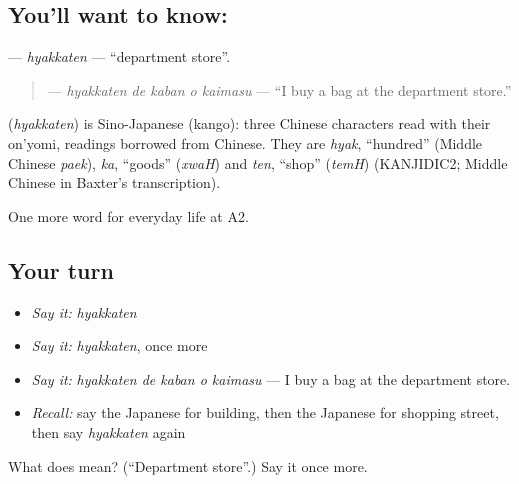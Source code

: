 \subsection*{You'll want to know: }
\textbf{} — \emph{hyakkaten} — \textquotedblleft{}department store\textquotedblright{}.

\begin{quote}
\textbf{  } — \emph{hyakkaten de kaban o kaimasu} — \textquotedblleft{}I buy a bag at the department store.\textquotedblright{}
\end{quote}

\begin{cousinweb}
\textbf{} (\emph{hyakkaten}) is Sino-Japanese (kango): three Chinese characters read with their on'yomi, readings borrowed from Chinese. They are \emph{hyak}, \textquotedblleft{}hundred\textquotedblright{} (Middle Chinese \emph{paek}), \emph{ka}, \textquotedblleft{}goods\textquotedblright{} (\emph{xwaH}) and \emph{ten}, \textquotedblleft{}shop\textquotedblright{} (\emph{temH}) (KANJIDIC2; Middle Chinese in Baxter's transcription).
\end{cousinweb}

\begin{grammarlens}[title={What you've built}]
One more word for everyday life at A2.
\end{grammarlens}

\subsection*{Your turn}
\begin{itemize}
\raggedright
  \item \emph{Say it:} \emph{hyakkaten}
  \item \emph{Say it:} \emph{hyakkaten}, once more
  \item \emph{Say it:} \emph{hyakkaten de kaban o kaimasu} — I buy a bag at the department store.
  \item \emph{Recall:} say the Japanese for building, then the Japanese for shopping street, then say \emph{hyakkaten} again
\end{itemize}

\begin{tcolorbox}[breakable,colback=teal!4,colframe=teal!35!black,title={Before you move on}]
What does  mean? (\textquotedblleft{}Department store\textquotedblright{}.) Say it once more.
\end{tcolorbox}

